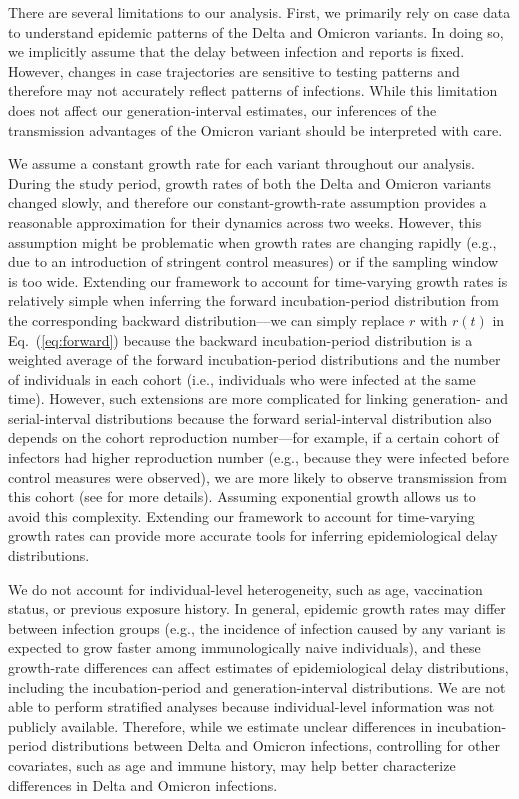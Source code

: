 \documentclass[12pt]{article}
\newcommand{\eref}[1]{Eq.~(\ref{eq:#1})}
\begin{document}
There are several limitations to our analysis.
First, we primarily rely on case data to understand epidemic patterns of the Delta and Omicron variants.
In doing so, we implicitly assume that the delay between infection and reports is fixed.
However, changes in case trajectories are sensitive to testing patterns and therefore may not accurately reflect patterns of infections.
While this limitation does not affect our generation-interval estimates, our inferences of the transmission advantages of the Omicron variant should be interpreted with care.

We assume a constant growth rate for each variant throughout our analysis.
During the study period, growth rates of both the Delta and Omicron variants changed slowly, and therefore our constant-growth-rate assumption provides a reasonable approximation for their dynamics across two weeks.
However, this assumption might be problematic when growth rates are changing rapidly (e.g., due to an introduction of stringent control measures) or if the sampling window is too wide.
Extending our framework to account for time-varying growth rates is relatively simple when inferring the forward incubation-period distribution from the corresponding backward distribution---we can simply replace $r$ with $r(t)$ in \eref{forward} because the backward incubation-period distribution is a weighted average of the forward incubation-period distributions and the number of individuals in each cohort (i.e., individuals who were infected at the same time).
However, such extensions are more complicated for linking generation- and serial-interval distributions because the forward serial-interval distribution also depends on the cohort reproduction number---for example, if a certain cohort of infectors had higher reproduction number (e.g., because they were infected before control measures were observed), we are more likely to observe transmission from this cohort (see \citep{park2021forward} for more details).
Assuming exponential growth allows us to avoid this complexity.
Extending our framework to account for time-varying growth rates can provide more accurate tools for inferring epidemiological delay distributions.

We do not account for individual-level heterogeneity, such as age, vaccination status, or previous exposure history.
In general, epidemic growth rates may differ between infection groups (e.g., the incidence of infection caused by any variant is expected to grow faster among immunologically naive individuals), and these growth-rate differences can affect estimates of epidemiological delay distributions, including the incubation-period and generation-interval distributions.
We are not able to perform stratified analyses because individual-level information was not publicly available.
Therefore, while we estimate unclear differences in incubation-period distributions between Delta and Omicron infections, controlling for other covariates, such as age and immune history, may help better characterize differences in Delta and Omicron infections.
\end{document}
